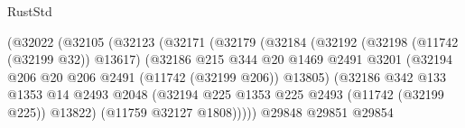 \begin{lexlean}{RustStd}
\begin{coremodule}
                                          (@32022
                                            (@32105
                                              (@32123
                                                (@32171
                                                  (@32179
                                                    (@32184
                                                      (@32192
                                                        (@32198 (@11742 (@32199 @32)) @13617)
                                                        (@32186
                                                          @215
                                                          @344
                                                          @20
                                                          @1469
                                                          @2491
                                                          @3201
                                                          (@32194
                                                            @206
                                                            @20
                                                            @206
                                                            @2491
                                                            (@11742 (@32199 @206))
                                                            @13805)
                                                          (@32186
                                                            @342
                                                            @133
                                                            @1353
                                                            @14
                                                            @2493
                                                            @2048
                                                            (@32194
                                                              @225
                                                              @1353
                                                              @225
                                                              @2493
                                                              (@11742 (@32199 @225))
                                                              @13822)
                                                            (@11759 @32127 @1808)))))
                                                    @29848
                                                    @29851
                                                    @29854

\end{coremodule}
\end{lexlean}
